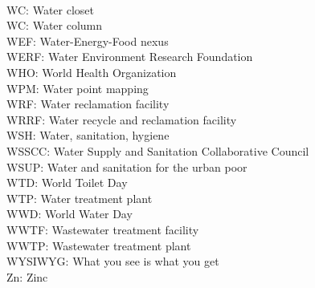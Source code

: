 \vspace{0.3cm}\\
WC:  Water closet
\vspace{0.3cm}\\
WC:  Water column
\vspace{0.3cm}\\
WEF:  Water-Energy-Food nexus
\vspace{0.3cm}\\
WERF:  Water Environment Research Foundation
\vspace{0.3cm}\\
WHO:  World Health Organization
\vspace{0.3cm}\\
WPM:  Water point mapping
\vspace{0.3cm}\\
WRF:  Water reclamation facility
\vspace{0.3cm}\\
WRRF:  Water recycle and reclamation facility
\vspace{0.3cm}\\
WSH:  Water, sanitation, hygiene
\vspace{0.3cm}\\
WSSCC:  Water Supply and Sanitation Collaborative Council
\vspace{0.3cm}\\
WSUP:  Water and sanitation for the urban poor
\vspace{0.3cm}\\
WTD:  World Toilet Day
\vspace{0.3cm}\\
WTP:  Water treatment plant
\vspace{0.3cm}\\
WWD:  World Water Day
\vspace{0.3cm}\\
WWTF:  Wastewater treatment facility
\vspace{0.3cm}\\
WWTP:  Wastewater treatment plant
\vspace{0.3cm}\\
WYSIWYG:  What you see is what you get
\vspace{0.3cm}\\
Zn:  Zinc


